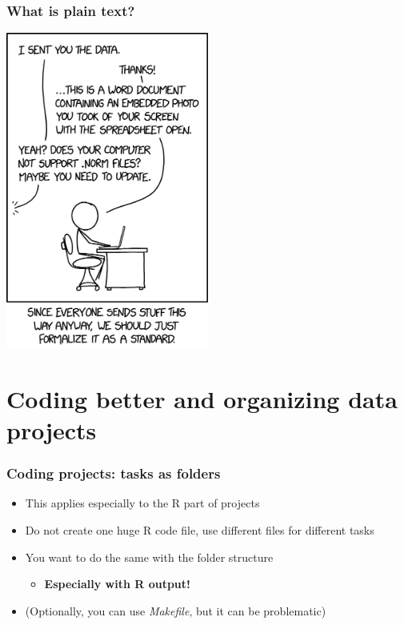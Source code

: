 \documentclass[aspectratio=43]{beamer}
\begin{document}
\begin{frame}
\frametitle{What is \textbf{plain text}?}
\centering

\includegraphics[width = 0.5\textwidth]{img/xkcd}
  

\end{frame}
  

\section{Coding better and organizing data projects}

\begin{frame}
\frametitle{Coding projects: tasks as folders}
\centering

\begin{itemize}
  \item This applies especially to the R part of projects
  \item Do not create one huge R code file, use different files for different tasks
  \item You want to do the same with the folder structure
  \begin{itemize}
    \item \textbf{Especially with R output!}
  \end{itemize}
  \item (Optionally, you can use \textit{Makefile}, but it can be problematic)
\end{itemize}

\end{frame}
\end{document}
